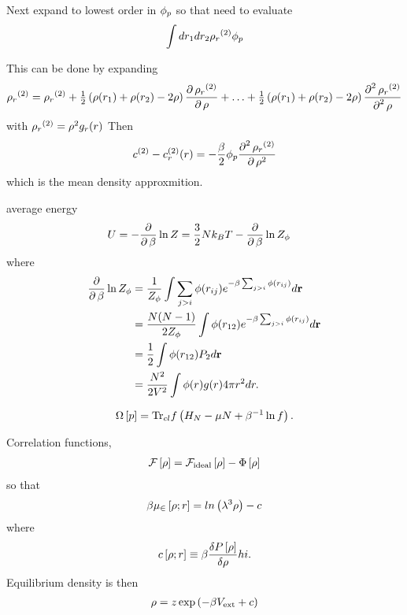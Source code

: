 {Next expand to lowest order in ${\phi_p}$
so that need to evaluate
\begin{align}
  \int dr_1 dr_2 {\rho_r}^{(2)} \phi_p
\end{align}

This can be done by expanding 
\begin{align}
  {\rho_r}^{(2)} = {\rho_r}^{(2)} + \tfrac{1}{2} \left( \rho(r_1)  + \rho(r_2) - 2\rho  \right) \frac{\operatorname{\partial} {\rho_r}^{(2)}}{\operatorname{\partial}\rho} + \ldots + \tfrac{1}{2} \left( \rho(r_1)  + \rho(r_2) - 2\rho  \right) \frac{\operatorname{\partial}^2 {\rho_r}^{(2)}}{\operatorname{\partial}^2\rho}
\end{align}
with ${\rho_r}^{(2)}=\rho^2 g_r(r)$
Then
\begin{align}
  c^{(2)} - c_r^{(2)}(r) = -\frac{\beta}{2} {\phi_p} \frac{\operatorname{\partial}^2 {\rho_r}^{(2)}}{\operatorname{\partial}\rho^2}
\end{align}
which is the mean density approxmition.


average energy 
\begin{align}
  U &= - \frac{\operatorname{\partial}}{\operatorname{\partial}\beta} \ln Z = \frac{3}{2}Nk_B T -  \frac{\operatorname{\partial}}{\operatorname{\partial}\beta}\ln Z_\phi
\end{align}
where
\begin{align}
   \frac{\operatorname{\partial}}{\operatorname{\partial}\beta}\ln Z_\phi &= \frac{1}{Z_\phi} \int \sum_{j>i} \phi(r_{ij})e^{-\beta \sum_{j>i} \phi(r_{ij})} d{\mathbf{\textbf{r}}}\\
   &= \frac{N(N-1)}{2 Z_\phi} \int \phi(r_{12}) e^{-\beta \sum_{j>i} \phi(r_{ij})} d{\mathbf{\textbf{r}}}\\
   &= \frac{1}{2} \int \phi(r_{12}) P_2 d{\mathbf{\textbf{r}}}\\
   &= \frac{N^2}{2V^2} \int \phi(r)g(r)4\pi r^2 dr.
\end{align}


\begin{align}
  \Omega\left[ p \right] = \textrm{Tr}_{cl} f\left( H_N - \mu N + \beta^{-1} \ln f \right).
\end{align}


Correlation functions,
\begin{align}
  {\cal F}\left[ \rho \right] = {\cal F}_{\text{ideal}}\left[ \rho \right] - \Phi\left[ \rho \right]
\end{align}
so that
\begin{align}
  \beta \mu_\in \left[ \rho;r \right] = ln \left( \lambda^3 \rho \right) - c
\end{align}
where
\begin{align}
  c \left[ \rho;r \right] \equiv \beta \frac{\delta P\left[ \rho \right]}{\delta \rho}hi.
\end{align}
Equilibrium density is then
\begin{align}
  \rho = z \exp \left( -\beta V_{\text{ext}} + c \right)
\end{align}

}
